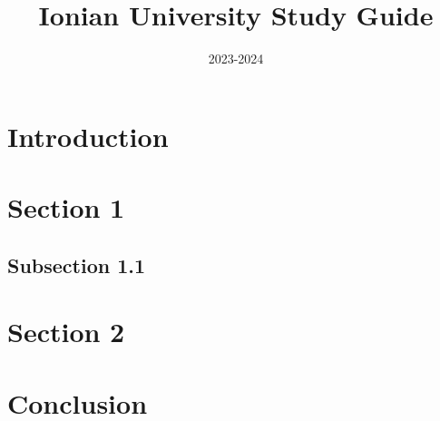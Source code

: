 \documentclass{article}
\title{Ionian University Study Guide}
\date{2023-2024}
\begin{document}
\maketitle

\tableofcontents
\newpage

\section{Introduction}

\section{Section 1}

\subsection{Subsection 1.1}

\section{Section 2}

\section{Conclusion}
\end{document}
